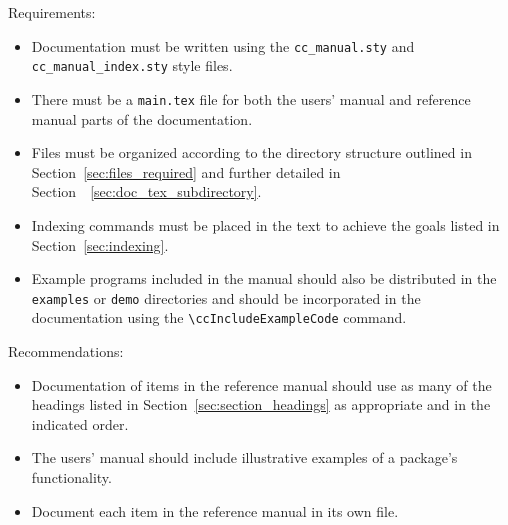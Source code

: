 \noindent
Requirements:
\begin{itemize}
   \item Documentation must be written using the {\tt cc\_manual.sty}
         and {\tt cc\_manual\_index.sty} style files.
   \item There must be a {\tt main.tex} file for both the users' manual
         and reference manual parts of the documentation.
   \item Files must be organized according to the directory structure
         outlined in Section~\ref{sec:files_required} and further detailed
         in Section~~\ref{sec:doc_tex_subdirectory}.
   \item Indexing commands must be placed in the text to achieve the
         goals listed in Section~\ref{sec:indexing}.
   \item Example programs included in the manual should also be distributed
         in the \texttt{examples} or \texttt{demo} directories and should
         be incorporated in the documentation  using the
         \verb|\ccIncludeExampleCode| command.
\end{itemize}

\noindent
Recommendations:
\begin{itemize}
   \item Documentation of items in the reference manual should use as
         many of the headings listed in Section~\ref{sec:section_headings}
         as appropriate and in the indicated order.
   \item The users' manual should include illustrative examples of a package's
         functionality.
   \item Document each item in the reference manual in its own file.
\end{itemize}

